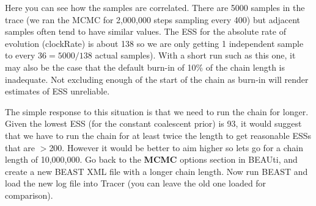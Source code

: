 \documentclass[12pt]{article}
\begin{document}
\medskip{}

Here you can see how the samples are correlated. There are 5000 samples in the trace (we ran the MCMC for 2,000,000
steps sampling every 400) but adjacent samples often tend to have similar values. The ESS for the absolute rate of evolution (clockRate) is about 138 so we are only getting 1 independent sample to every $36=5000/138$ actual samples). With a short run such as this one, it may also be the case that the default burn-in of 10\% of the chain length is inadequate. Not excluding enough of the start of the chain as burn-in will render estimates of ESS unreliable.

The simple response to this situation is that we need to run the chain for longer. Given the lowest ESS (for the constant coalescent prior) is 93, it
would suggest that we have to run the chain for at least twice the length to get reasonable ESSs that are $>$200. However it would be better to aim
higher so lets go for a chain length of 10,000,000. Go back to the {\bf MCMC} options section in BEAUti, and create a new BEAST
XML file with a longer chain length. Now run BEAST and load the new log file into Tracer (you can leave the old one loaded
for comparison). 

\end{document}
